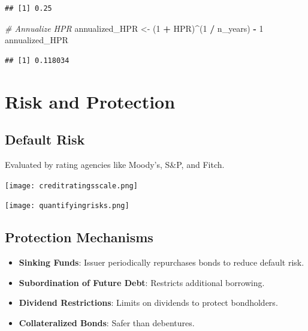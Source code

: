 \documentclass[
]{book}
\newenvironment{Shaded}{\begin{snugshade}}{\end{snugshade}}
\newcommand{\CommentTok}[1]{\textcolor[rgb]{0.56,0.35,0.01}{\textit{#1}}}
\newcommand{\DecValTok}[1]{\textcolor[rgb]{0.00,0.00,0.81}{#1}}
\newcommand{\NormalTok}[1]{#1}
\newcommand{\OtherTok}[1]{\textcolor[rgb]{0.56,0.35,0.01}{#1}}
\newcommand{\SpecialCharTok}[1]{\textcolor[rgb]{0.81,0.36,0.00}{\textbf{#1}}}
\providecommand{\tightlist}{%
  \setlength{\itemsep}{0pt}\setlength{\parskip}{0pt}}
\begin{document}
\begin{verbatim}
## [1] 0.25
\end{verbatim}

\begin{Shaded}
\begin{Highlighting}[]
\CommentTok{\# Annualize HPR}
\NormalTok{annualized\_HPR }\OtherTok{\textless{}{-}}\NormalTok{ (}\DecValTok{1} \SpecialCharTok{+}\NormalTok{ HPR)}\SpecialCharTok{\^{}}\NormalTok{(}\DecValTok{1} \SpecialCharTok{/}\NormalTok{ n\_years) }\SpecialCharTok{{-}} \DecValTok{1}
\NormalTok{annualized\_HPR}
\end{Highlighting}
\end{Shaded}

\begin{verbatim}
## [1] 0.118034
\end{verbatim}

\hypertarget{risk-and-protection}{%
\section{Risk and Protection}\label{risk-and-protection}}

\hypertarget{default-risk}{%
\subsection{Default Risk}\label{default-risk}}

Evaluated by rating agencies like Moody's, S\&P, and Fitch.

\texttt{[image: creditratingsscale.png]}

\texttt{[image: quantifyingrisks.png]}

\hypertarget{protection-mechanisms}{%
\subsection{Protection Mechanisms}\label{protection-mechanisms}}

\begin{itemize}
\tightlist
\item
  \textbf{Sinking Funds}: Issuer periodically repurchases bonds to reduce default risk.
\item
  \textbf{Subordination of Future Debt}: Restricts additional borrowing.
\item
  \textbf{Dividend Restrictions}: Limits on dividends to protect bondholders.
\item
  \textbf{Collateralized Bonds}: Safer than debentures.
\end{itemize}
\end{document}
